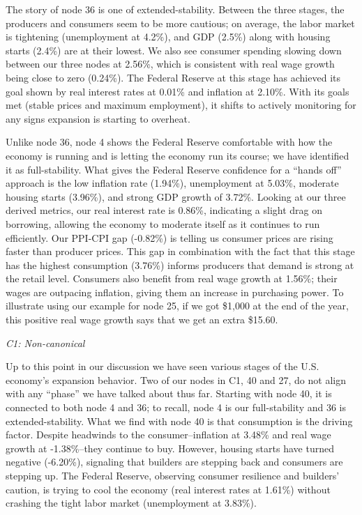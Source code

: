 \documentclass[
  10pt,
  letterpaper,
  DIV=11,
  numbers=noendperiod]{scrartcl}
\begin{document}
The story of node 36 is one of extended-stability. Between the three
stages, the producers and consumers seem to be more cautious; on
average, the labor market is tightening (unemployment at 4.2\%), and GDP
(2.5\%) along with housing starts (2.4\%) are at their lowest. We also
see consumer spending slowing down between our three nodes at 2.56\%,
which is consistent with real wage growth being close to zero (0.24\%).
The Federal Reserve at this stage has achieved its goal shown by real
interest rates at 0.01\% and inflation at 2.10\%. With its goals met
(stable prices and maximum employment), it shifts to actively monitoring
for any signs expansion is starting to overheat.

Unlike node 36, node 4 shows the Federal Reserve comfortable with how
the economy is running and is letting the economy run its course; we
have identified it as full-stability. What gives the Federal Reserve
confidence for a ``hands off'' approach is the low inflation rate
(1.94\%), unemployment at 5.03\%, moderate housing starts (3.96\%), and
strong GDP growth of 3.72\%. Looking at our three derived metrics, our
real interest rate is 0.86\%, indicating a slight drag on borrowing,
allowing the economy to moderate itself as it continues to run
efficiently. Our PPI-CPI gap (-0.82\%) is telling us consumer prices are
rising faster than producer prices. This gap in combination with the
fact that this stage has the highest consumption (3.76\%) informs
producers that demand is strong at the retail level. Consumers also
benefit from real wage growth at 1.56\%; their wages are outpacing
inflation, giving them an increase in purchasing power. To illustrate
using our example for node 25, if we got \$1,000 at the end of the year,
this positive real wage growth says that we get an extra \$15.60.

\emph{C1: Non-canonical}

Up to this point in our discussion we have seen various stages of the
U.S. economy's expansion behavior. Two of our nodes in C1, 40 and 27, do
not align with any ``phase'' we have talked about thus far. Starting
with node 40, it is connected to both node 4 and 36; to recall, node 4
is our full-stability and 36 is extended-stability. What we find with
node 40 is that consumption is the driving factor. Despite headwinds to
the consumer--inflation at 3.48\% and real wage growth at -1.38\%--they
continue to buy. However, housing starts have turned negative (-6.20\%),
signaling that builders are stepping back and consumers are stepping up.
The Federal Reserve, observing consumer resilience and builders'
caution, is trying to cool the economy (real interest rates at 1.61\%)
without crashing the tight labor market (unemployment at 3.83\%).
\end{document}
